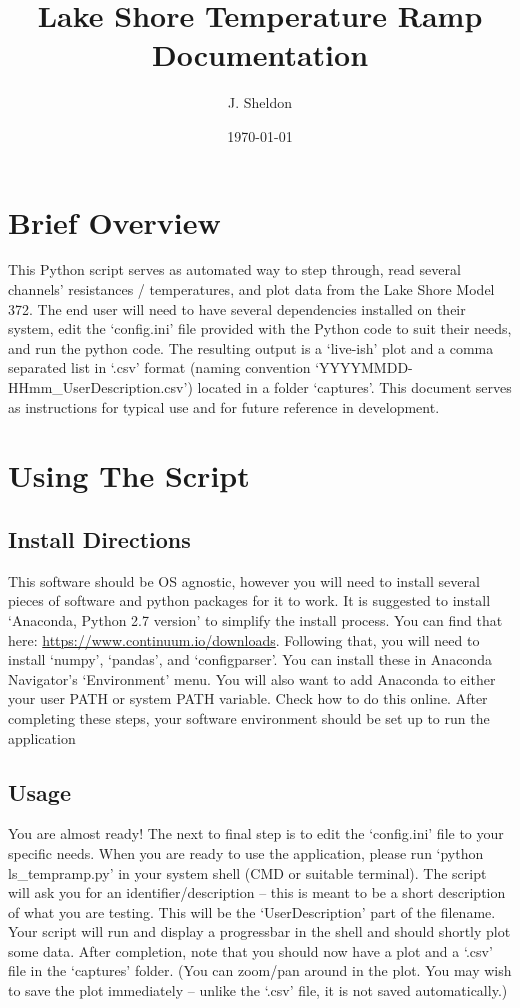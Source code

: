 \documentclass{article}
\title{Lake Shore Temperature Ramp\\ Documentation}
\date{\today}
\author{J. Sheldon}
\begin{document}
\maketitle
\section{Brief Overview}
This Python script serves as automated way to step through, read several channels' resistances / temperatures, and plot data from the Lake Shore Model 372.  The end user will need to have several dependencies installed on their system, edit the `config.ini' file provided with the Python code to suit their needs, and run the python code. The resulting output is a `live-ish' plot and a comma separated list in `.csv' format (naming convention `YYYYMMDD-HHmm\_UserDescription.csv') located in a folder `captures'. This document serves as instructions for typical use and for future reference in development.
\section{Using The Script}
\subsection{Install Directions}
This software should be OS agnostic, however you will need to install several pieces of software and python packages for it to work. It is suggested to install `Anaconda, Python 2.7 version' to simplify the install process. You can find that here: \url{https://www.continuum.io/downloads}. Following that, you will need to install `numpy', `pandas',  and `configparser'. You can install these in Anaconda Navigator's `Environment' menu. You will also want to add Anaconda to either your user PATH or system PATH variable. Check how to do this online. After completing these steps, your software environment should be set up to run the application \\

\subsection{Usage}
You are almost ready! The next to final step is to edit the `config.ini' file to your specific needs. When you are ready to use the application, please run `python ls\_tempramp.py' in your system shell (CMD or suitable terminal). The script will ask you for an identifier/description -- this is meant to be a short description of what you are testing. This will be the `UserDescription' part of the filename. Your script will run and display a progressbar in the shell and should shortly plot some data. After completion, note that you should now have a plot and a `.csv'  file in the `captures' folder. (You can zoom/pan around in the plot. You may wish to save the plot immediately -- unlike the `.csv' file, it is not saved automatically.)
\end{document}
